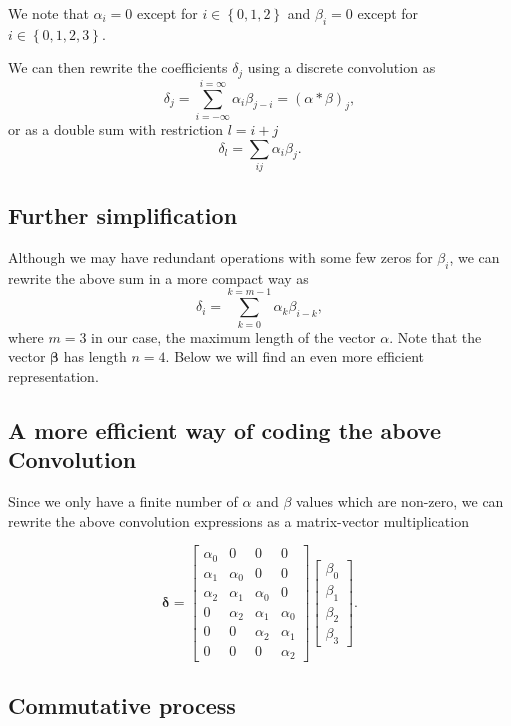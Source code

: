 \documentclass[%
oneside,                 %
final,                   %
10pt]{article}
\begin{document}
We note that $\alpha_i=0$ except for $i\in \left\{0,1,2\right\}$ and $\beta_i=0$ except for $i\in\left\{0,1,2,3\right\}$.

We can then rewrite the coefficients $\delta_j$ using a discrete convolution as
\[
\delta_j = \sum_{i=-\infty}^{i=\infty}\alpha_i\beta_{j-i}=(\alpha * \beta)_j,
\]
or as a double sum with restriction $l=i+j$
\[
\delta_l = \sum_{ij}\alpha_i\beta_{j}.
\]

\subsection{Further simplification}

Although we may have redundant operations with some few zeros for $\beta_i$, we can rewrite the above sum in a more compact way as 
\[
\delta_i = \sum_{k=0}^{k=m-1}\alpha_k\beta_{i-k},
\]
where $m=3$ in our case, the maximum length of
the vector $\alpha$. Note that the vector $\bm{\beta}$ has length $n=4$. Below we will find an even more efficient representation.

\subsection{A more efficient way of coding the above Convolution}

Since we only have a finite number of $\alpha$ and $\beta$ values
which are non-zero, we can rewrite the above convolution expressions
as a matrix-vector multiplication

\[
\bm{\delta}=\begin{bmatrix}\alpha_0 & 0 & 0 & 0 \\
                            \alpha_1 & \alpha_0 & 0 & 0 \\
			    \alpha_2 & \alpha_1 & \alpha_0 & 0 \\
			    0 & \alpha_2 & \alpha_1 & \alpha_0 \\
			    0 & 0 & \alpha_2 & \alpha_1 \\
			    0 & 0 & 0 & \alpha_2
			    \end{bmatrix}\begin{bmatrix} \beta_0 \\ \beta_1 \\ \beta_2 \\ \beta_3\end{bmatrix}.
\]

\subsection{Commutative process}
\end{document}
